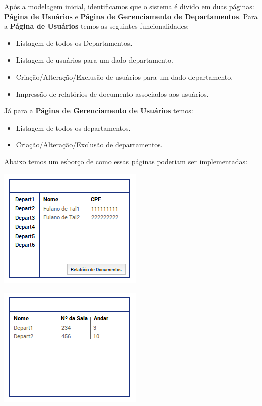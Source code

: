 \documentclass[a4paper,10pt]{article}
\begin{document}
Após a modelagem inicial, identificamos que o sistema é divido em duas páginas:
\textbf{Página de Usuários} e \textbf{Página de Gerenciamento de Departamentos}.
Para a \textbf{Página de Usuários} temos as seguintes funcionalidades:
	\begin{itemize}
  		\item Listagem de todos os Departamentos.
  		\item Listagem de usuários para um dado departamento.
  		\item Criação/Alteração/Exclusão de usuários para um dado departamento.
  		\item Impressão de relatórios de documento associados aos usuários.
	\end{itemize}

Já para a \textbf{Página de Gerenciamento de Usuários} temos:
	\begin{itemize}
	  \item Listagem de todos os departamentos.
	  \item Criação/Alteração/Exclusão de departamentos. 
	\end{itemize}
	
Abaixo temos um esborço de como essas páginas poderiam ser implementadas:
	\begin{multicols}{2}
		\begingroup
			\centering
	 		\includegraphics[scale=.7]{images/usuarioPage.png} 
		\endgroup
		
		\columnbreak
		
		\begingroup
			\centering
	 		\includegraphics[scale=.7]{images/departamentoPage.png} 
		\endgroup	
	\end{multicols}		
	 
\end{document}
